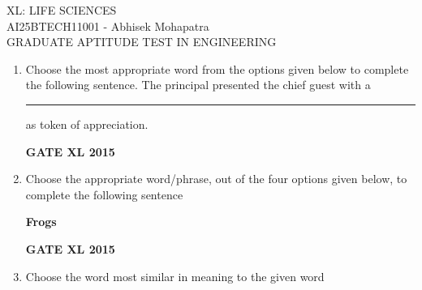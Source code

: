\documentclass[journal,12pt,onecolumn]{IEEEtran}
\begin{document}
\begin{center}
    \huge{XL: LIFE SCIENCES}\\
    \large{AI25BTECH11001 - Abhisek Mohapatra}\\
    \large{GRADUATE APTITUDE TEST IN ENGINEERING}
\end{center}

\begin{enumerate}

\item Choose the most appropriate word from the options given below to complete the following sentence. 
	The principal presented the chief guest with a \rule{1cm}{0.15mm} as token of appreciation.
    \begin{enumerate}
    \end{enumerate}

\begin{flushright}\textbf{GATE XL 2015}\end{flushright}

\item Choose the appropriate word/phrase, out of the four options given below, to complete the following sentence

	\textbf{Frogs}
    \begin{enumerate}
    \end{enumerate}

\begin{flushright}\textbf{GATE XL 2015}\end{flushright}
\item Choose the word most similar in meaning to the given word


\end{enumerate}
\end{document}
